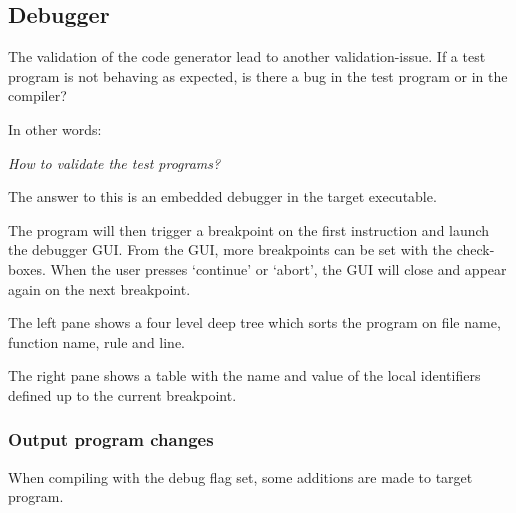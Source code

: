 \subsection{Debugger}\label{debugger}
The validation of the code generator lead to another validation-issue.
If a test program is not behaving as expected, is there a bug in the test program or in the compiler?

In other words:

\textit{How to validate the test programs?}

The answer to this is an embedded debugger in the target executable.


The program will then trigger a breakpoint on the first instruction and launch the debugger GUI.
From the GUI, more breakpoints can be set with the check-boxes.
When the user presses `continue' or `abort', the GUI will close and appear again on the next breakpoint.

The left pane shows a four level deep tree which sorts the program on file name, function name, rule and line.

The right pane shows a table with the name and value of the local identifiers defined up to the current breakpoint.

\subsubsection{Output program changes}
When compiling with the debug flag set, some additions are made to target program.

